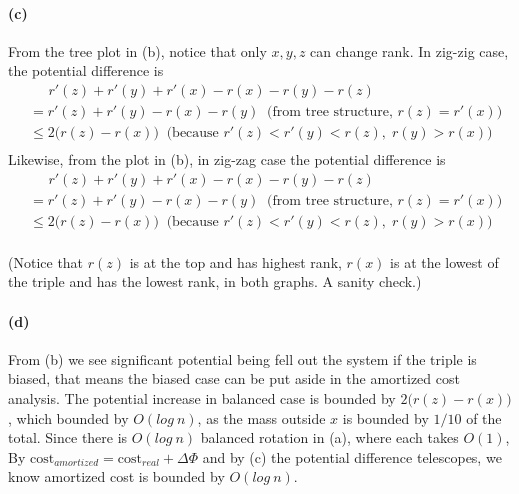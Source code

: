 \documentclass[10pt,letter]{article}
\begin{document}
\paragraph{(c)} From the tree plot in (b), notice that only $x, y, z$ can change rank. In zig-zig case, the potential difference is 
\begin{align*}
&\;\;\;\;\; r'(z) + r'(y) + r'(x) - r(x) - r(y) - r(z)\\
&= r'(z) +r'(y) - r(x) - r(y) \;\; \big(\text{from tree structure, } r(z) = r'(x)\big)\\
&\leq 2\big( r(z) -  r(x)\big) \;\; \big(\text{because } r'(z) < r'(y) < r(z), \; r(y) > r(x)\big)\\
\end{align*}
Likewise, from the plot in (b), in zig-zag case the potential difference is 
\begin{align*}
&\;\;\;\;\; r'(z) + r'(y) + r'(x) - r(x) - r(y) - r(z)\\
&= r'(z) +r'(y) - r(x) - r(y) \;\; \big(\text{from tree structure, } r(z) = r'(x)\big)\\
&\leq 2\big( r(z) -  r(x)\big) \;\; \big(\text{because } r'(z) < r'(y) < r(z), \; r(y) > r(x)\big)\\
\end{align*}

(Notice that $r(z)$ is at the top and has highest rank, $r(x)$ is at the lowest of the triple and has the lowest rank, in both graphs. A sanity check.)

\paragraph{(d)} From (b) we see significant potential being fell out the system if the triple is biased, that means the biased case can be put aside in the amortized cost analysis. The potential increase in balanced case is bounded by $2\big( r(z) -  r(x)\big)$, which bounded by $O(log\:n)$, as the mass outside $x$ is bounded by $1/10$ of the total. Since there is $O(log\:n)$ balanced rotation in (a), where each takes $O(1)$, By $\text{cost}_{amortized} = \text{cost}_{real} + \Delta{\Phi}$ and by (c) the potential difference telescopes, we know amortized cost is bounded by $O(log\:n)$. 
\end{document}
